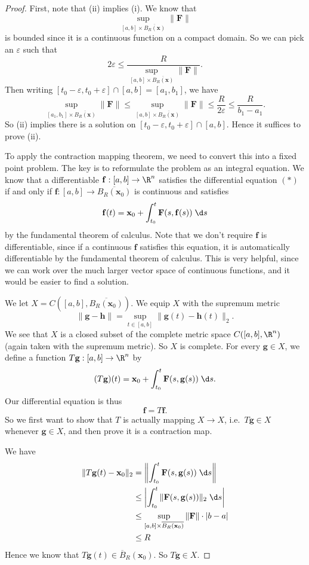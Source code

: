 \documentclass[a4paper]{article}
\begin{document}
\begin{proof}
  First, note that (ii) implies (i). We know that
  \[
    \sup_{[a, b]\times \overline{B_R(\mathbf{x})}}\|\mathbf{F}\|
  \]
  is bounded since it is a continuous function on a compact domain. So we can pick an $\varepsilon$ such that
  \[
    2\varepsilon \leq \frac{R}{\sup_{[a, b]\times \overline{B_R(\mathbf{x})}}\|\mathbf{F}\|}.
  \]
  Then writing $[t_0 - \varepsilon, t_0 + \varepsilon] \cap [a, b] = [a_1, b_1]$, we have
  \[
    \sup_{[a_1, b_1]\times \overline{B_R(\mathbf{x})}}\|\mathbf{F}\| \leq \sup_{[a, b]\times \overline{B_R(\mathbf{x})}}\|\mathbf{F}\| \leq \frac{R}{2\varepsilon} \leq \frac{R}{b_1 - a_1}.
  \]
  So (ii) implies there is a solution on $[t_0 - \varepsilon, t_0 + \varepsilon] \cap [a, b]$. Hence it suffices to prove (ii).

  To apply the contraction mapping theorem, we need to convert this into a fixed point problem. The key is to reformulate the problem as an integral equation. We know that a differentiable $\mathbf{f}: [a, b] \to \R^n$ satisfies the differential equation $(*)$ if and only if $\mathbf{f}: [a, b] \to \overline{B_R(\mathbf{x}_0)}$ is continuous and satisfies
  \[
    \mathbf{f}(t) = \mathbf{x}_0 + \int_{t_0}^t \mathbf{F}(s, \mathbf{f}(s))\;\d s
  \]
  by the fundamental theorem of calculus. Note that we don't require $\mathbf{f}$ is differentiable, since if a continuous $\mathbf{f}$ satisfies this equation, it is automatically differentiable by the fundamental theorem of calculus. This is very helpful, since we can work over the much larger vector space of continuous functions, and it would be easier to find a solution.

  We let $X = C([a, b], \overline{B_R(\mathbf{x}_0)})$. We equip $X$ with the supremum metric
  \[
    \|\mathbf{g} - \mathbf{h}\| = \sup_{t \in [a, b]} \|\mathbf{g}(t) - \mathbf{h}(t)\|_2.
  \]
  We see that $X$ is a closed subset of the complete metric space $C([a, b] , \R^n)$ (again taken with the supremum metric). So $X$ is complete. For every $\mathbf{g} \in X$, we define a function $T\mathbf{g}: [a, b] \to \R^n$ by
  \[
    (T\mathbf{g}) (t) = \mathbf{x}_0 + \int_{t_0}^t \mathbf{F}(s, \mathbf{g}(s))\;\d s.
  \]
  Our differential equation is thus
  \[
    \mathbf{f} = T\mathbf{f}.
  \]
  So we first want to show that $T$ is actually mapping $X \to X$, i.e.\ $T\mathbf{g} \in X$ whenever $\mathbf{g} \in X$, and then prove it is a contraction map.

  We have
  \begin{align*}
    \|T\mathbf{g}(t) - \mathbf{x}_0\|_2 &= \left\|\int_{t_0}^t \mathbf{F}(s, \mathbf{g}(s))\;\d s\right\|\\
    &\leq \left|\int_{t_0}^t \|\mathbf{F} (s, \mathbf{g}(s))\|_2\;\d s\right|\\
    &\leq \sup_{[a, b] \times \overline{B_R(\mathbf{x}_0)}} \|\mathbf{F}\| \cdot |b - a|\\
    &\leq R
  \end{align*}
  Hence we know that $T\mathbf{g}(t) \in \overline{B}_R(\mathbf{x}_0)$. So $T \mathbf{g} \in X$.


\end{proof}
\end{document}
